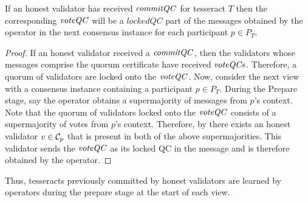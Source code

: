 \begin{lemma}\label{lem:highestqc} 
    If an honest validator has received $\mathit{commitQC}$ for tesseract $T$ then the corresponding $\mathit{voteQC}$ will be a $lockedQC$ part of the  messages obtained by the operator in the next consensus instance for each participant $p\in P_T$.
\end{lemma} 
\begin{proof}
    If an honest validator received a $\mathit{commitQC}$, then the validators whose  messages comprise the quorum certificate have received $\mathit{voteQCs}$. %
    Therefore, a quorum of validators are locked onto the $\mathit{voteQC}$. 
    Now, consider the next view with a consensus instance containing a participant $p\in P_T$.
    During the Prepare stage, say the operator obtains a supermajority of  messages from $p$'s context.
    Note that the quorum of validators locked onto the $\mathit{voteQC}$ consists of a supermajority of votes from $p$'s context.
    Therefore, by  there exists an honest validator $v\in\mathcal{C}_p$ that is present in both of the above supermajorities.
    This validator sends the $\mathit{voteQC}$ as its locked QC in the  message and is therefore obtained by the operator. 
\end{proof}
Thus, tesseracts previously committed by honest validators are learned by operators during the prepare stage at the start of each view.

